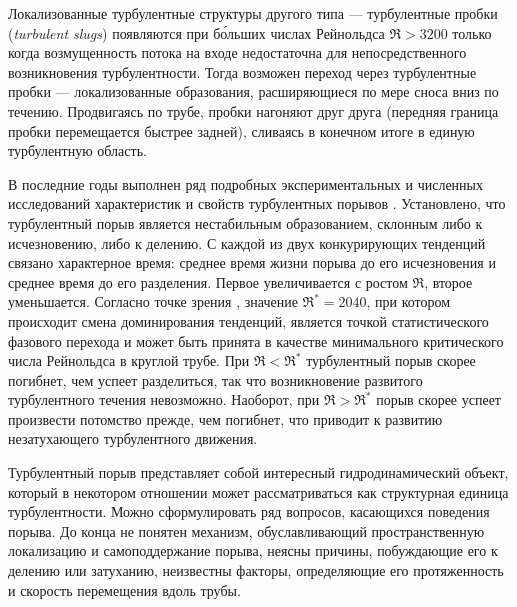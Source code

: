Локализованные турбулентные структуры другого типа --- турбулентные пробки ({\it turbulent slugs}) появляются при б\'{о}льших числах Рейнольдса $\Re>3200$ только когда возмущенность потока на входе недостаточна для непосредственного возникновения турбулентности. Тогда возможен переход через турбулентные пробки --- локализованные образования, расширяющиеся по мере сноса вниз по течению. Продвигаясь по трубе, пробки нагоняют друг друга (передняя граница пробки перемещается быстрее задней), сливаясь в конечном итоге в единую турбулентную область.

В последние годы выполнен ряд подробных экспериментальных и численных исследований характеристик и свойств турбулентных порывов \cite{Priymak2004, Peixinho2006, Hof2006finite, Willis2007, Hof2008, Kuik2010, Avila2011}. Установлено, что турбулентный порыв является нестабильным образованием, склонным либо к исчезновению, либо к делению. С каждой из двух конкурирующих тенденций связано характерное время: среднее время жизни порыва до его исчезновения и среднее время до его разделения. Первое увеличивается с ростом $\Re$, второе уменьшается. Согласно точке зрения \cite{Avila2011}, значение $\Re^*=2040$, при котором происходит смена доминирования тенденций, является точкой статистического фазового перехода и может быть принята в качестве минимального критического числа Рейнольдса в круглой трубе. При $\Re<\Re^*$ турбулентный порыв скорее погибнет, чем успеет разделиться, так что возникновение развитого турбулентного течения невозможно. Наоборот, при $\Re>\Re^*$ порыв скорее успеет произвести потомство прежде, чем погибнет, что приводит к развитию незатухающего турбулентного движения.

Турбулентный порыв представляет собой интересный гидродинамический объект, который в некотором отношении может рассматриваться как структурная единица турбулентности. Можно сформулировать ряд вопросов, касающихся поведения порыва. До конца не понятен механизм, обуславливающий пространственную локализацию и самоподдержание порыва, неясны причины, побуждающие его к делению или затуханию, неизвестны факторы, определяющие его протяженность и скорость перемещения вдоль трубы.

